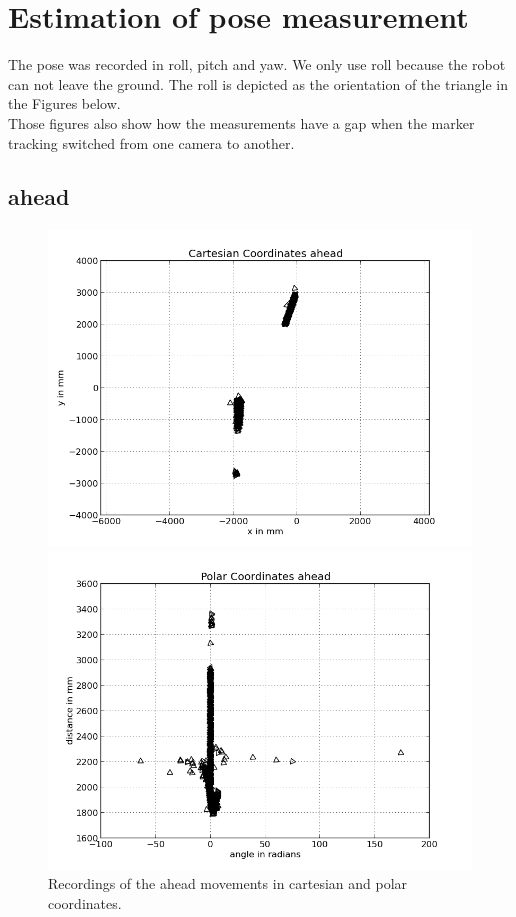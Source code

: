 \documentclass{scrartcl}
\begin{document}
\section{Estimation of pose measurement}
The pose was recorded in roll, pitch and yaw. We only use roll because the robot can not leave the ground. The roll is depicted as the orientation of the triangle in the Figures below.\\
Those figures also show how the measurements have a gap when the marker tracking switched from one camera to another.

\subsection{ahead}
\begin{figure}[H]
\centering
\begin{minipage}{.5\textwidth}
  \centering
  \includegraphics[width=.8\linewidth]{img/ahead.png}
\end{minipage}%
\begin{minipage}{.5\textwidth}
  \centering
  \includegraphics[width=.8\linewidth]{img/ahead_pc.png}
\end{minipage}
\caption{Recordings of the ahead movements in cartesian and polar coordinates.}
\label{fig:ahead}
\end{figure}
\end{document}

